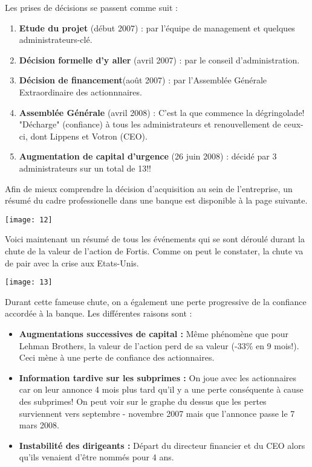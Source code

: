 Les prises de décisions se passent comme suit : 
\begin{enumerate}
	\item \textbf{Etude du projet} (début 2007) : par l'équipe de management et quelques administrateurs-clé. 
	      
	\item \textbf{Décision formelle d'y aller} (avril 2007) : par le conseil d'administration. 
	      
	\item \textbf{Décision de financement}(août 2007) : par l'Assemblée Générale Extraordinaire des actionnnaires.
	      
	\item \textbf{Assemblée Générale} (avril 2008) : C'est la que commence la dégringolade! "Décharge" (confiance) à tous les administrateurs et renouvellement de ceux-ci, dont Lippens et Votron (CEO).  
	      
	\item \textbf{Augmentation de capital d'urgence} (26 juin 2008) : décidé par 3 administrateurs sur un total de 13!!
\end{enumerate}

Afin de mieux comprendre la décision d'acquisition au sein de l'entreprise, un résumé du cadre professionelle dans une banque est disponible à la page suivante. 

\begin{center}
	\texttt{[image: 12]}
\end{center}

Voici maintenant un résumé de tous les événements qui se sont déroulé durant la chute de la valeur de l'action de Fortis. Comme on peut le constater, la chute va de pair avec la crise aux Etats-Unis. 

\begin{center}
	\texttt{[image: 13]}
\end{center}

Durant cette fameuse chute, on a également une perte progressive de la confiance accordée à la banque. Les différentes raisons sont : 

\begin{itemize}
	\item \textbf{Augmentations successives de capital :} Même phénomène que pour Lehman Brothers, la valeur de l'action perd de sa valeur (-33\% en 9 mois!). Ceci mène à une perte de confiance des actionnaires.
	      
	\item \textbf{Information tardive sur les subprimes :} On joue avec les actionnaires car on leur annonce 4 mois plus tard qu'il y a une perte conséquente à cause des subprimes! On peut voir sur le graphe du dessus que les pertes surviennent vers septembre - novembre 2007 mais que l'annonce passe le 7 mars 2008. 
	      
	\item \textbf{Instabilité des dirigeants :} Départ du directeur financier et du CEO alors qu'ils venaient d'être nommés pour 4 ans. 
\end{itemize}


